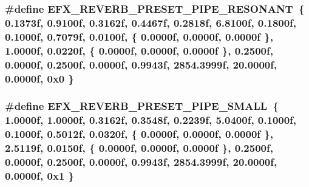 \subsubsection[{\texorpdfstring{E\+F\+X\+\_\+\+R\+E\+V\+E\+R\+B\+\_\+\+P\+R\+E\+S\+E\+T\+\_\+\+P\+I\+P\+E\+\_\+\+R\+E\+S\+O\+N\+A\+NT}{EFX_REVERB_PRESET_PIPE_RESONANT}}]{\setlength{\rightskip}{0pt plus 5cm}\#define E\+F\+X\+\_\+\+R\+E\+V\+E\+R\+B\+\_\+\+P\+R\+E\+S\+E\+T\+\_\+\+P\+I\+P\+E\+\_\+\+R\+E\+S\+O\+N\+A\+NT~\{ 0.\+1373f, 0.\+9100f, 0.\+3162f, 0.\+4467f, 0.\+2818f, 6.\+8100f, 0.\+1800f, 0.\+1000f, 0.\+7079f, 0.\+0100f, \{ 0.\+0000f, 0.\+0000f, 0.\+0000f \}, 1.\+0000f, 0.\+0220f, \{ 0.\+0000f, 0.\+0000f, 0.\+0000f \}, 0.\+2500f, 0.\+0000f, 0.\+2500f, 0.\+0000f, 0.\+9943f, 2854.\+3999f, 20.\+0000f, 0.\+0000f, 0x0 \}}\hypertarget{efx-presets_8h_af6bed932704e2dc1a1631fdd6393a1c5}{}\label{efx-presets_8h_af6bed932704e2dc1a1631fdd6393a1c5}
\subsubsection[{\texorpdfstring{E\+F\+X\+\_\+\+R\+E\+V\+E\+R\+B\+\_\+\+P\+R\+E\+S\+E\+T\+\_\+\+P\+I\+P\+E\+\_\+\+S\+M\+A\+LL}{EFX_REVERB_PRESET_PIPE_SMALL}}]{\setlength{\rightskip}{0pt plus 5cm}\#define E\+F\+X\+\_\+\+R\+E\+V\+E\+R\+B\+\_\+\+P\+R\+E\+S\+E\+T\+\_\+\+P\+I\+P\+E\+\_\+\+S\+M\+A\+LL~\{ 1.\+0000f, 1.\+0000f, 0.\+3162f, 0.\+3548f, 0.\+2239f, 5.\+0400f, 0.\+1000f, 0.\+1000f, 0.\+5012f, 0.\+0320f, \{ 0.\+0000f, 0.\+0000f, 0.\+0000f \}, 2.\+5119f, 0.\+0150f, \{ 0.\+0000f, 0.\+0000f, 0.\+0000f \}, 0.\+2500f, 0.\+0000f, 0.\+2500f, 0.\+0000f, 0.\+9943f, 2854.\+3999f, 20.\+0000f, 0.\+0000f, 0x1 \}}\hypertarget{efx-presets_8h_a1965e441ad772bb05942baa1ffbd9297}{}\label{efx-presets_8h_a1965e441ad772bb05942baa1ffbd9297}
